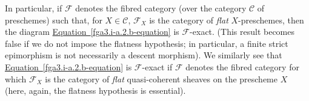   In particular, if \(\mathcal {F}\) denotes the fibred category (over the category \(\mathcal {C}\) of preschemes) such that, for \(X\in \mathcal {C}\), \(\mathcal {F}_X\) is the category of \emph{flat} \(X\)-preschemes, then the diagram \hyperref[fga3.i-a.2.b-equation]{Equation~\ref*{fga3.i-a.2.b-equation}} is \(\mathcal {F}\)-exact.
  (This result becomes false if we do not impose the flatness hypothesis; in particular, a finite strict epimorphism is not necessarily a descent morphism).
  We similarly see that \hyperref[fga3.i-a.2.b-equation]{Equation~\ref*{fga3.i-a.2.b-equation}} is \(\mathcal {F}\)-exact if \(\mathcal {F}\) denotes the fibred category for which \(\mathcal {F}_X\) is the category of \emph{flat} quasi-coherent sheaves on the prescheme \(X\) (here, again, the flatness hypothesis is essential).
  
